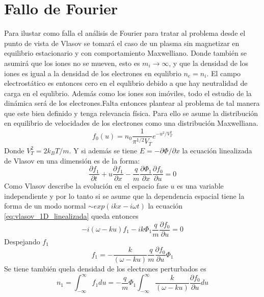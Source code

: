 \documentclass[../tesis_main_file.tex]{subfiles}
\begin{document}
\section{Fallo de Fourier}
Para ilustar como falla el análisis de Fourier para tratar al problema desde el punto de vista de Vlasov se tomará el caso de un plasma sin magnetizar en equilibrio estacionario y con comportamiento Maxwelliano. Donde también se asumirá que los iones no se mueven, esto es $m_i \to \infty$, y que la densidad de los iones es igual a la densidad de los electrones en equlibrio $n_e =n_i$. El campo electrostático es entonces cero en el equlibrio debido a que hay neutralidad de carga en el equlibrio. Además como los iones son imóviles, todo el estudio de la dinámica será de los electrones.Falta entonces plantear al problema de tal manera que este bien definido y tenga relevancia física. Para ello se asume la distribución en equilibrio de velocidades de los electrones como una distribución Maxwelliana.
\begin{equation}
\label{eq:fourier_distribucion_maxwelliana}
f_0(u)=n_0\frac{1}{\pi^{1/2}V_T}e^{-u^2/V_T^2}
\end{equation}
Donde $V_T^2=2k_BT/m$. Y si además se tiene $E=- \partial \Phi/\partial x$ la ecuación linealizada de Vlasov en una dimensión es de la forma:
\begin{equation}
\label{eq:vlasov_1D_linealizada}
\frac{\partial f_1}{\partial t}+u\frac{\partial f_1}{\partial x}-\frac{q}{m}\frac{\partial \Phi _1}{\partial x}\frac{\partial f_0}{\partial u}=0
\end{equation}
Como Vlasov describe la evolución en el espacio fase $u$ es una variable independiente y por lo tanto si se asume que la dependencia espacial tiene la forma de un modo normal $\sim exp(ikx-i\omega t)$ la ecuación \ref{eq:vlasov_1D_linealizada} queda entonces
\begin{equation}
-i(\omega-ku)f_1- ik\Phi _1 \frac{q}{m}\frac{\partial f_0}{\partial u}=0
\end{equation}
Despejando $f_1$
\begin{equation}
f_1 =-\frac{k}{(\omega -ku)}\frac{q}{m}\frac{\partial f_0}{\partial u}\Phi_1
\end{equation}
Se tiene también quela densidad de los electrones perturbados es
\begin{equation}
\label{eq:densidad_electrones_perturbados}
n_1 = \int^{\infty}_{-\infty} f_1 du=-\frac{q}{m}\Phi_1 \int^{\infty}_{-\infty}\frac{k}{(\omega-ku)}\frac{\partial f_0}{\partial u}du
\end{equation}
\end{document}
